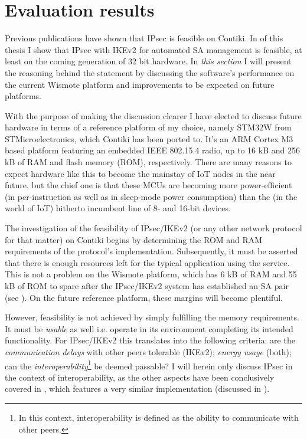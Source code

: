 \documentclass[final,a4paper,twoside,11pt,onecolumn]{report}
\begin{document}
\section{Evaluation results}
Previous publications\cite{raza11securing} have shown that IPsec is feasible on Contiki. In  of this thesis I show that IPsec with IKEv2 for automated SA management is feasible, at least on the coming generation of 32 bit hardware. In \emph{this section} I will present the reasoning behind the statement by discussing the software's performance on the current Wismote platform and improvements to be expected on future platforms.

With the purpose of making the discussion clearer I have elected to discuss future hardware in terms of a reference platform of my choice, namely STM32W from STMicroelectronics, which Contiki has been ported to. It's an ARM Cortex M3 based platform featuring an embedded IEEE 802.15.4 radio, up to 16 kB and 256 kB of RAM and flash memory (ROM), respectively. There are many reasons to expect hardware like this to become the mainstay of IoT nodes in the near future, but the chief one is that these MCUs are becoming more power-efficient\cite{ko2012low} (in per-instruction as well as in sleep-mode power consumption) than the (in the world of IoT) hitherto incumbent line of 8- and 16-bit devices.

The investigation of the feasibility of IPsec/IKEv2 (or any other network protocol for that matter) on Contiki begins by determining the ROM and RAM requirements of the protocol's implementation. Subsequently, it must be asserted that there is enough resources left for the typical application using the service. This is not a problem on the Wismote platform, which has 6 kB of RAM and 55 kB of ROM to spare after the IPsec/IKEv2 system has established an SA pair (see ). On the future reference platform, these margins will become plentiful.

However, feasibility is not achieved by simply fulfilling the memory requirements. It must be \emph{usable} as well i.e. operate in its environment completing its intended functionality. For IPsec/IKEv2 this translates into the following criteria: are the \emph{communication delays} with other peers tolerable (IKEv2); \emph{energy usage} (both); can the \emph{interoperability}\footnote{In this context, interoperability is defined as the ability to communicate with other peers.} be deemed passable? I will herein only discuss IPsec in the context of interoperability, as the other aspects have been conclusively covered in \cite{raza11securing}, which features a very similar implementation (discussed in ).
\end{document}
